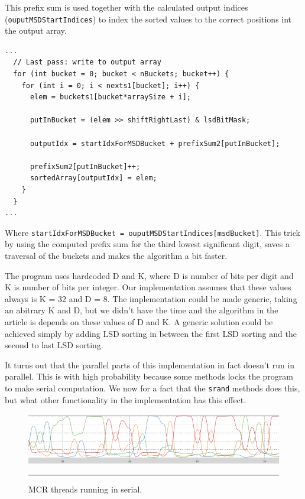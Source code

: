 This prefix sum is used together with the calculated output indices (\verb!ouputMSDStartIndices!) to index the sorted values to the correct positions int the output array.
\begin{lstlisting}
...
  // Last pass: write to output array
  for (int bucket = 0; bucket < nBuckets; bucket++) {
    for (int i = 0; i < nexts1[bucket]; i++) {
      elem = buckets1[bucket*arraySize + i];

      putInBucket = (elem >> shiftRightLast) & lsdBitMask;

      outputIdx = startIdxForMSDBucket + prefixSum2[putInBucket];

      prefixSum2[putInBucket]++;
      sortedArray[outputIdx] = elem;
    }
  }
... 
\end{lstlisting}
Where \verb!startIdxForMSDBucket = ouputMSDStartIndices[msdBucket]!.
This trick by using the computed prefix sum for the third lowest significant digit, saves a traversal of the buckets and makes the algorithm a bit faster.

The program uses hardcoded D and K, where D is number of bits per digit and K is number of bits per integer. Our implementation assumes that these values always is K = 32 and D = 8.
The implementation could be made generic, taking an abitrary K and D, but we didn't have the time and the algorithm in the article is depends on these values of D and K.
A generic solution could be achieved simply by adding LSD sorting in between the first LSD sorting and the second to last LSD sorting.

It turns out that the parallel parts of this implementation in fact doesn't run in parallel. This is with high probability because some methods locks the program to make serial computation.
We now for a fact that the \verb!srand! methods does this, but what other functionality in the implementation has this effect.   

\begin{figure}[htbp]
	\centering
		\includegraphics[width=\textwidth]{./Figures/Project2b/multicore_cpu_usage.png}
		\rule{35em}{0.5pt}
	\caption[Multicore CPU usage]{
	MCR threads running in serial.
	}
	\label{fig:multicore_cpu_usage}
\end{figure}

